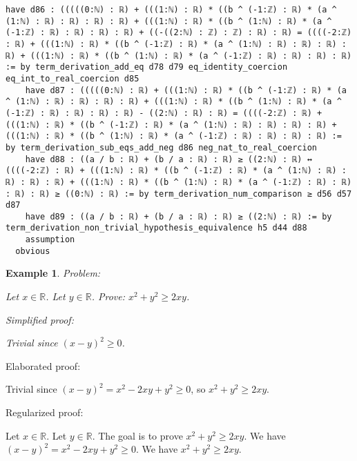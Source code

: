 \documentclass{article}
\newtheorem{example}{Example}
\begin{document}
\begin{tcolorbox}[colback=white!10, width=\linewidth]
\begin{lstlisting}[language=Lean4]
    have d86 : (((((0:ℕ) : ℝ) + (((1:ℕ) : ℝ) * ((b ^ (-1:ℤ) : ℝ) * (a ^ (1:ℕ) : ℝ) : ℝ) : ℝ) : ℝ) + (((1:ℕ) : ℝ) * ((b ^ (1:ℕ) : ℝ) * (a ^ (-1:ℤ) : ℝ) : ℝ) : ℝ) : ℝ) + ((-((2:ℕ) : ℤ) : ℤ) : ℝ) : ℝ) = ((((-2:ℤ) : ℝ) + (((1:ℕ) : ℝ) * ((b ^ (-1:ℤ) : ℝ) * (a ^ (1:ℕ) : ℝ) : ℝ) : ℝ) : ℝ) + (((1:ℕ) : ℝ) * ((b ^ (1:ℕ) : ℝ) * (a ^ (-1:ℤ) : ℝ) : ℝ) : ℝ) : ℝ) := by term_derivation_add_eq d78 d79 eq_identity_coercion eq_int_to_real_coercion d85
    have d87 : (((((0:ℕ) : ℝ) + (((1:ℕ) : ℝ) * ((b ^ (-1:ℤ) : ℝ) * (a ^ (1:ℕ) : ℝ) : ℝ) : ℝ) : ℝ) + (((1:ℕ) : ℝ) * ((b ^ (1:ℕ) : ℝ) * (a ^ (-1:ℤ) : ℝ) : ℝ) : ℝ) : ℝ) - ((2:ℕ) : ℝ) : ℝ) = ((((-2:ℤ) : ℝ) + (((1:ℕ) : ℝ) * ((b ^ (-1:ℤ) : ℝ) * (a ^ (1:ℕ) : ℝ) : ℝ) : ℝ) : ℝ) + (((1:ℕ) : ℝ) * ((b ^ (1:ℕ) : ℝ) * (a ^ (-1:ℤ) : ℝ) : ℝ) : ℝ) : ℝ) := by term_derivation_sub_eqs_add_neg d86 neg_nat_to_real_coercion
    have d88 : ((a / b : ℝ) + (b / a : ℝ) : ℝ) ≥ ((2:ℕ) : ℝ) ↔ ((((-2:ℤ) : ℝ) + (((1:ℕ) : ℝ) * ((b ^ (-1:ℤ) : ℝ) * (a ^ (1:ℕ) : ℝ) : ℝ) : ℝ) : ℝ) + (((1:ℕ) : ℝ) * ((b ^ (1:ℕ) : ℝ) * (a ^ (-1:ℤ) : ℝ) : ℝ) : ℝ) : ℝ) ≥ ((0:ℕ) : ℝ) := by term_derivation_num_comparison ≥ d56 d57 d87
    have d89 : ((a / b : ℝ) + (b / a : ℝ) : ℝ) ≥ ((2:ℕ) : ℝ) := by term_derivation_non_trivial_hypothesis_equivalence h5 d44 d88
    assumption
  obvious

\end{lstlisting}
\end{tcolorbox}


\begin{example}
Problem:
\begin{tcolorbox}[colback=yellow!10, width=\linewidth]
Let $x\in\mathbb{R}$. Let $y\in\mathbb{R}$.
    Prove: $x^2 + y^2 \ge 2xy$.
\end{tcolorbox}

Simplified proof:
\begin{tcolorbox}[colback=blue!10, width=\linewidth]
Trivial since $(x-y)^2 \ge 0$.
\end{tcolorbox}
\end{example}

Elaborated proof:
\begin{tcolorbox}[colback=green!10, width=\linewidth]
Trivial since $(x-y)^2 = x^2 -2xy + y^2 \ge 0$, so $x^2 + y^2 \ge 2xy$.
\end{tcolorbox}

Regularized proof:
\begin{tcolorbox}[colback=red!10, width=\linewidth]
Let $x\in\mathbb{R}$.
Let $y\in\mathbb{R}$.
The goal is to prove $x^2 + y^2 \ge 2xy$.
We have ${{(x-y)}}^2 = x^2 -2xy + y^2 \ge 0$.
We have $x^2 + y^2 \ge 2xy$.
\end{tcolorbox}
\end{document}
